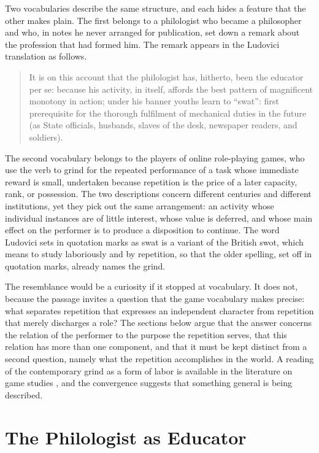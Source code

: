\documentclass[11pt]{article}
\begin{document}
Two vocabularies describe the same structure, and each hides a feature that the other makes plain. The first belongs to a philologist who became a philosopher and who, in notes he never arranged for publication, set down a remark about the profession that had formed him. The remark appears in the Ludovici translation as follows.

\begin{quote}
It is on this account that the philologist has, hitherto, been the educator per se: because his activity, in itself, affords the best pattern of magnificent monotony in action; under his banner youths learn to ``swat'': first prerequisite for the thorough fulfilment of mechanical duties in the future (as State officials, husbands, slaves of the desk, newspaper readers, and soldiers). \cite[Aph.\ 888]{wtp2}
\end{quote}

The second vocabulary belongs to the players of online role-playing games, who use the verb to grind for the repeated performance of a task whose immediate reward is small, undertaken because repetition is the price of a later capacity, rank, or possession. The two descriptions concern different centuries and different institutions, yet they pick out the same arrangement: an activity whose individual instances are of little interest, whose value is deferred, and whose main effect on the performer is to produce a disposition to continue. The word Ludovici sets in quotation marks as swat is a variant of the British swot, which means to study laboriously and by repetition, so that the older spelling, set off in quotation marks, already names the grind.

The resemblance would be a curiosity if it stopped at vocabulary. It does not, because the passage invites a question that the game vocabulary makes precise: what separates repetition that expresses an independent character from repetition that merely discharges a role? The sections below argue that the answer concerns the relation of the performer to the purpose the repetition serves, that this relation has more than one component, and that it must be kept distinct from a second question, namely what the repetition accomplishes in the world. A reading of the contemporary grind as a form of labor is available in the literature on game studies \cite{yee2006}, and the convergence suggests that something general is being described.

\section{The Philologist as Educator}
\end{document}
